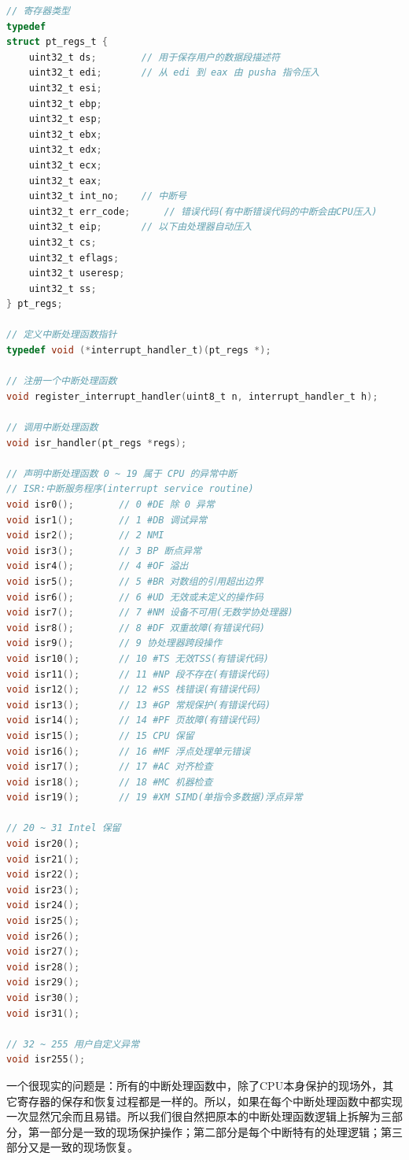 \begin{lstlisting}[language = C, caption = include/idt.h]
// 寄存器类型
typedef
struct pt_regs_t {
	uint32_t ds; 		// 用于保存用户的数据段描述符
	uint32_t edi; 		// 从 edi 到 eax 由 pusha 指令压入
	uint32_t esi; 
	uint32_t ebp;
	uint32_t esp;
	uint32_t ebx;
	uint32_t edx;
	uint32_t ecx;
	uint32_t eax;
	uint32_t int_no; 	// 中断号
	uint32_t err_code;  	// 错误代码(有中断错误代码的中断会由CPU压入)
	uint32_t eip; 		// 以下由处理器自动压入
	uint32_t cs; 		
	uint32_t eflags;
	uint32_t useresp;
	uint32_t ss;
} pt_regs;

// 定义中断处理函数指针
typedef void (*interrupt_handler_t)(pt_regs *);

// 注册一个中断处理函数
void register_interrupt_handler(uint8_t n, interrupt_handler_t h);

// 调用中断处理函数
void isr_handler(pt_regs *regs);

// 声明中断处理函数 0 ~ 19 属于 CPU 的异常中断
// ISR:中断服务程序(interrupt service routine)
void isr0(); 		// 0 #DE 除 0 异常 
void isr1(); 		// 1 #DB 调试异常 
void isr2(); 		// 2 NMI 
void isr3(); 		// 3 BP 断点异常 
void isr4(); 		// 4 #OF 溢出 
void isr5(); 		// 5 #BR 对数组的引用超出边界 
void isr6(); 		// 6 #UD 无效或未定义的操作码 
void isr7(); 		// 7 #NM 设备不可用(无数学协处理器) 
void isr8(); 		// 8 #DF 双重故障(有错误代码) 
void isr9(); 		// 9 协处理器跨段操作 
void isr10(); 		// 10 #TS 无效TSS(有错误代码) 
void isr11(); 		// 11 #NP 段不存在(有错误代码) 
void isr12(); 		// 12 #SS 栈错误(有错误代码) 
void isr13(); 		// 13 #GP 常规保护(有错误代码) 
void isr14(); 		// 14 #PF 页故障(有错误代码) 
void isr15(); 		// 15 CPU 保留 
void isr16(); 		// 16 #MF 浮点处理单元错误 
void isr17(); 		// 17 #AC 对齐检查 
void isr18(); 		// 18 #MC 机器检查 
void isr19(); 		// 19 #XM SIMD(单指令多数据)浮点异常

// 20 ~ 31 Intel 保留
void isr20();
void isr21();
void isr22();
void isr23();
void isr24();
void isr25();
void isr26();
void isr27();
void isr28();
void isr29();
void isr30();
void isr31();

// 32 ~ 255 用户自定义异常
void isr255();
\end{lstlisting}

\par 一个很现实的问题是：所有的中断处理函数中，除了CPU本身保护的现场外，其它寄存器的保存和恢复过程都是一样的。所以，如果在每个中断处理函数中都实现一次显然冗余而且易错。所以我们很自然把原本的中断处理函数逻辑上拆解为三部分，第一部分是一致的现场保护操作；第二部分是每个中断特有的处理逻辑；第三部分又是一致的现场恢复。

